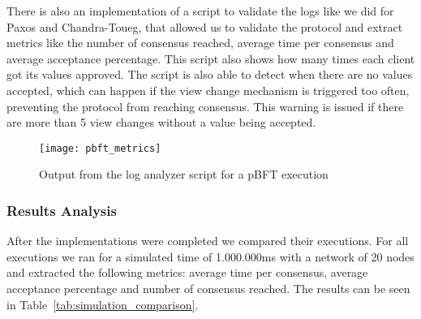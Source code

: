 There is also an implementation of a script to validate the logs like we did for Paxos and Chandra-Toueg,
that allowed us to validate the protocol and extract metrics like the number of consensus reached,
average time per consensus and average acceptance percentage. This script also shows how many times each client
got its values approved.
The script is also able to detect when there are no values accepted, which can happen if the view change
mechanism is triggered too often, preventing the protocol from reaching consensus. This warning is issued if there
are more than 5 view changes without a value being accepted.

\begin{figure}[h]
	\centering
	\texttt{[image: pbft\_metrics]}
	\caption{Output from the log analyzer script for a pBFT execution}
	\label{fig:pbft_metrics}
\end{figure}

\subsubsection{Results Analysis}\label{sub:results_comparison}
After the implementations were completed we compared their executions.
For all executions we ran for a simulated time of 1.000.000ms with a network of 20 nodes and extracted
the following metrics: average time per consensus, average acceptance percentage and number of consensus reached.
The results can be seen in Table~\ref{tab:simulation_comparison}.


